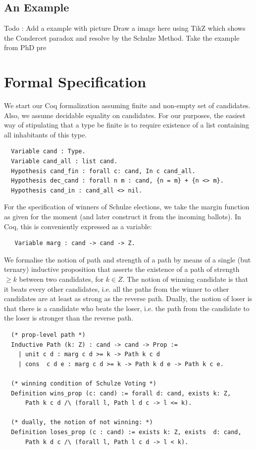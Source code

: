 	\subsection{An Example}
	 Todo : Add a example with picture
	 Draw a image here using TikZ which shows the Condercet paradox 
	 and resolve by the Schulze Method. Take the example from PhD pre
	 
	
	
\section{Formal Specification} \label{sec:spec}
	We start our Coq formalization assuming finite and non-empty 
	set of candidates. Also, we assume decidable equality on 
	candidates. For our purposes, the
	easiest way of stipulating that a type be finite is to require
	existence of a list containing all inhabitants of this type.

\begin{verbatim}
  Variable cand : Type.
  Variable cand_all : list cand.
  Hypothesis cand_fin : forall c: cand, In c cand_all.
  Hypothesis dec_cand : forall n m : cand, {n = m} + {n <> m}.
  Hypothesis cand_in : cand_all <> nil.
\end{verbatim}

\noindent
For the specification of winners of Schulze elections, we take the
margin function as given for the moment (and later construct it from
the incoming ballots). In Coq, this is conveniently expressed as a
variable:
\begin{verbatim}
   Variable marg : cand -> cand -> Z.
\end{verbatim}

\noindent
We formalise the notion of path and strength of a path by means of a
single (but ternary) inductive proposition that asserts the
existence of a path of strength $\geq k$ between two candidates, for
$k \in Z$. The notion of winning candidate is that it beats every other candidates, i.e.  all the paths from 
the winner to other candidates are at least as strong as the reverse path. Dually, the notion of loser
 is that there is a candidate who beats the loser, i.e. the path from the candidate to the loser is 
 stronger than the reverse path. 


\begin{verbatim}
  (* prop-level path *)
  Inductive Path (k: Z) : cand -> cand -> Prop :=
    | unit c d : marg c d >= k -> Path k c d
    | cons  c d e : marg c d >= k -> Path k d e -> Path k c e.
    
  (* winning condition of Schulze Voting *)
  Definition wins_prop (c: cand) := forall d: cand, exists k: Z,
      Path k c d /\ (forall l, Path l d c -> l <= k).

  (* dually, the notion of not winning: *)
  Definition loses_prop (c : cand) := exists k: Z, exists  d: cand,
      Path k d c /\ (forall l, Path l c d -> l < k).
\end{verbatim}


